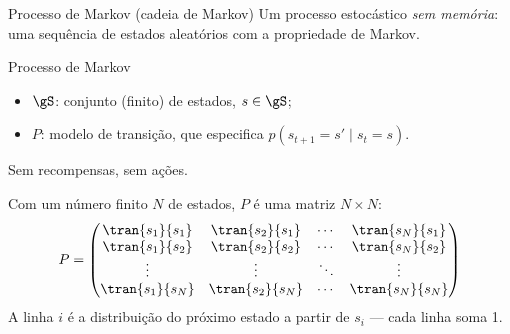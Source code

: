 \documentclass[aspectratio=169, 11pt]{beamer}
\begin{document}
\begin{frame}{Processo de Markov (cadeia de Markov)}
  Um processo estocástico \emph{sem memória}: uma sequência de estados
  aleatórios com a propriedade de Markov.

  \begin{defbox}{Processo de Markov}
    \begin{itemize}
      \item $\gS$: conjunto (finito) de estados, $s \in \gS$;
      \item $P$: modelo de transição, que especifica
            $p(s_{t+1} = s' \mid s_t = s)$.
    \end{itemize}
    Sem recompensas, sem ações.
  \end{defbox}

  Com um número finito $N$ de estados, $P$ é uma matriz $N \times N$:
  {\small
  \[
    P =
    \begin{pmatrix}
      \tran{s_1}{s_1} & \tran{s_2}{s_1} & \cdots & \tran{s_N}{s_1} \\
      \tran{s_1}{s_2} & \tran{s_2}{s_2} & \cdots & \tran{s_N}{s_2} \\
      \vdots          & \vdots          & \ddots & \vdots          \\
      \tran{s_1}{s_N} & \tran{s_2}{s_N} & \cdots & \tran{s_N}{s_N}
    \end{pmatrix}
  \]}%
  \vspace{-0.8em}
  {\small\color{rlCinza} A linha $i$ é a distribuição do próximo estado a
  partir de $s_i$ — cada linha soma 1.}
\end{frame}
\end{document}
